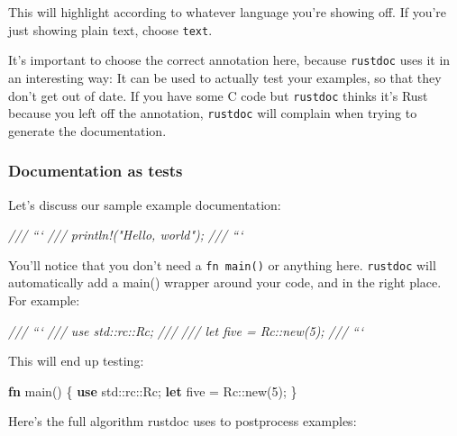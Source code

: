\documentclass[a4paper,]{book}
\newenvironment{Shaded}{\begin{snugshade}}{\end{snugshade}}
\newcommand{\KeywordTok}[1]{\textcolor[rgb]{0.13,0.29,0.53}{\textbf{{#1}}}}
\newcommand{\DecValTok}[1]{\textcolor[rgb]{0.00,0.00,0.81}{{#1}}}
\newcommand{\CommentTok}[1]{\textcolor[rgb]{0.56,0.35,0.01}{\textit{{#1}}}}
\newcommand{\NormalTok}[1]{{#1}}
\begin{document}
This will highlight according to whatever language you're showing off.
If you're just showing plain text, choose \texttt{text}.

It's important to choose the correct annotation here, because
\texttt{rustdoc} uses it in an interesting way: It can be used to
actually test your examples, so that they don't get out of date. If you
have some C code but \texttt{rustdoc} thinks it's Rust because you left
off the annotation, \texttt{rustdoc} will complain when trying to
generate the documentation.

\subsubsection{Documentation as tests}\label{documentation-as-tests}

Let's discuss our sample example documentation:

\begin{Shaded}
\begin{Highlighting}[]
\CommentTok{/// ```}
\CommentTok{/// println!("Hello, world");}
\CommentTok{/// ```}
\end{Highlighting}
\end{Shaded}

You'll notice that you don't need a \texttt{fn\ main()} or anything
here. \texttt{rustdoc} will automatically add a main() wrapper around
your code, and in the right place. For example:

\begin{Shaded}
\begin{Highlighting}[]
\CommentTok{/// ```}
\CommentTok{/// use std::rc::Rc;}
\CommentTok{///}
\CommentTok{/// let five = Rc::new(5);}
\CommentTok{/// ```}
\end{Highlighting}
\end{Shaded}

This will end up testing:

\begin{Shaded}
\begin{Highlighting}[]
\KeywordTok{fn} \NormalTok{main() \{}
    \KeywordTok{use} \NormalTok{std::rc::Rc;}
    \KeywordTok{let} \NormalTok{five = Rc::new(}\DecValTok{5}\NormalTok{);}
\NormalTok{\}}
\end{Highlighting}
\end{Shaded}

Here's the full algorithm rustdoc uses to postprocess examples:
\end{document}
